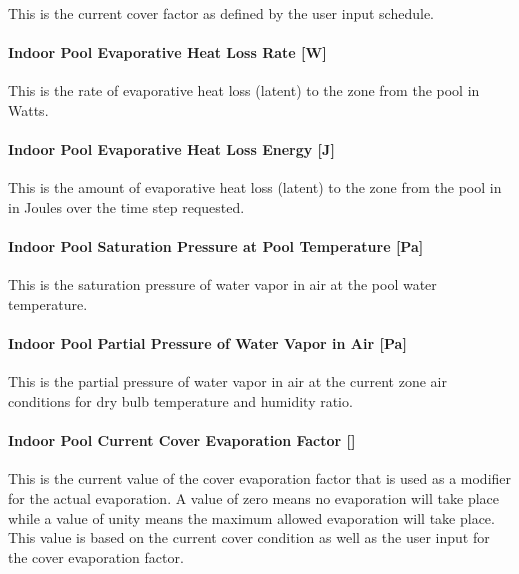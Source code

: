 This is the current cover factor as defined by the user input schedule.

\paragraph{Indoor Pool Evaporative Heat Loss Rate {[}W{]}}\label{indoor-pool-evaporative-heat-loss-rate-w}

This is the rate of evaporative heat loss (latent) to the zone from the pool in Watts.

\paragraph{Indoor Pool Evaporative Heat Loss Energy {[}J{]}}\label{indoor-pool-evaporative-heat-loss-energy-j}

This is the amount of evaporative heat loss (latent) to the zone from the pool in in Joules over the time step requested.

\paragraph{Indoor Pool Saturation Pressure at Pool Temperature {[}Pa{]}}\label{indoor-pool-saturation-pressure-at-pool-temperature-pa}

This is the saturation pressure of water vapor in air at the pool water temperature.

\paragraph{Indoor Pool Partial Pressure of Water Vapor in Air {[}Pa{]}}\label{indoor-pool-partia-pressure-of-water-vapor-in-air-pa}

This is the partial pressure of water vapor in air at the current zone air conditions for dry bulb temperature and humidity ratio.

\paragraph{Indoor Pool Current Cover Evaporation Factor {[]}}\label{indoor-pool-current-cover-evaporation-factor}

This is the current value of the cover evaporation factor that is used as a modifier for the actual evaporation.  A value of zero means no evaporation will take place while a value of unity means the maximum allowed evaporation will take place.  This value is based on the current cover condition as well as the user input for the cover evaporation factor.

